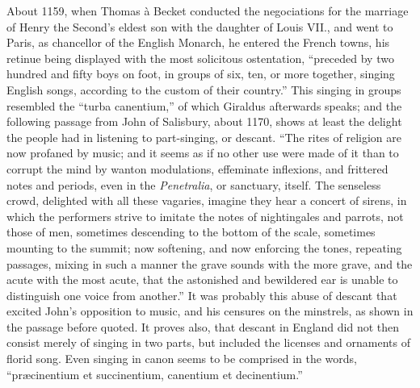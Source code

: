 About 1159, when Thomas à Becket conducted the negociations for the
marriage of Henry the Second’s eldest son with the daughter of Louis VII., and
went to Paris, as chancellor of the English Monarch, he entered the French towns,
his retinue being displayed with the most solicitous ostentation, “preceded by two
hundred and fifty boys on foot, in groups of six, ten, or more together, singing
English songs, according to the custom of their country.” %
This singing in groups
resembled the “turba canentium,” of which Giraldus afterwards speaks; and the
following passage from John of Salisbury, about 1170, shows at least the delight
the people had in listening to part-singing, or descant. “The rites of religion
are now profaned by music; and it seems as if no other use were made of it than
to corrupt the mind by wanton modulations, effeminate inflexions, and frittered
notes and periods, even in the \textit{Penetralia}, or sanctuary, itself. The senseless
crowd, delighted with all these vagaries, imagine they hear a concert of sirens,
in which the performers strive to imitate the notes of nightingales and parrots,
not those of men, sometimes descending to the bottom of the scale, sometimes
mounting to the summit; now softening, and now enforcing the tones, repeating
passages, mixing in such a manner the grave sounds with the more grave, and
the acute with the most acute, that the astonished and bewildered ear is unable
to distinguish one voice from another.” %
It was probably this abuse of descant
that excited John’s opposition to music, and his censures on the minstrels, as
shown in the passage before quoted. It proves also, that descant in England did
not then consist merely of singing in two parts, but included the licenses and
ornaments of florid song. Even singing in canon seems to be comprised in the
words, “præcinentium et succinentium, canentium et decinentium.”

